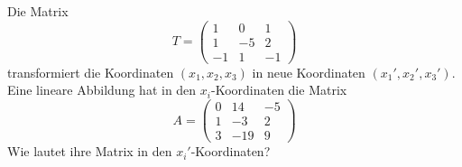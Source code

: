 %
%
%
%
%
Die Matrix
\[
T=
\begin{pmatrix}
   1&  0&  1\\
   1& -5&  2\\
  -1&  1& -1
\end{pmatrix}
\]
transformiert die Koordinaten $(x_1,x_2,x_3)$ in neue Koordinaten $(x_1',x_2',x_3')$.
Eine lineare Abbildung hat in den $x_i$-Koordinaten die Matrix
\[
A=
\begin{pmatrix}
    0&  14&  -5\\
    1&  -3&   2\\
    3& -19&   9
\end{pmatrix}
\]
Wie lautet ihre Matrix in den $x_i'$-Koordinaten?

